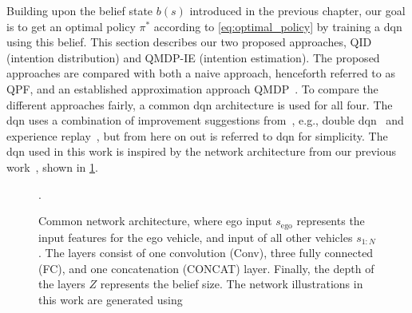 
Building upon the belief state $b(s)$ introduced in the previous chapter, our goal is to get an optimal policy $\pi^*$ according to \eqref{eq:optimal_policy} by training a \gls{dqn} using this belief. This section describes our two proposed approaches, QID (intention distribution) and QMDP-IE (intention estimation). 
The proposed approaches are compared with both a naive approach, henceforth referred to as QPF, and an established approximation approach QMDP~\cite{Littman1995}. 
To compare the different approaches fairly, a common \gls{dqn} architecture is used for all four. 
The \gls{dqn} uses a combination of improvement suggestions from~\cite{rainbow}, e.g., double \gls{dqn}~\cite{Hasselt2016ddqn} and experience replay~\cite{Lin1992}, but from here on out is referred to \gls{dqn} for simplicity. The \gls{dqn} used in this work is inspired by the network architecture from our previous work~\cite{tram2019}, shown in \ref{fig:network}. 
\begin{figure}[!h]
    \centering
    
    \caption{Common network architecture, where ego input $s_\mathrm{ego}$ represents the input features for the ego vehicle, and input of all other vehicles $s_{1:N}$. The layers consist of one convolution (Conv), three fully connected (FC), and one concatenation (CONCAT) layer. Finally, the depth of the layers $Z$ represents the belief size. The network illustrations in this work are generated using \cite{PlotNeuralNet}}.
    \label{fig:network}
\end{figure}

